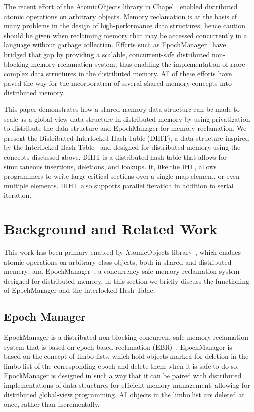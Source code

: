 \documentclass[letterpaper, 10 pt, conference]{ieeeconf}  %
\begin{document}
The recent effort of the AtomicObjects library in Chapel~\cite{epochManager} enabled distributed atomic operations on arbitrary objects.
Memory reclamation is at the basis of many problems in the design of high-performance data structures; hence caution should be given when reclaiming memory that may be accessed concurrently in a language without garbage collection. Efforts such as EpochManager~\cite{epochManager} have bridged that gap by providing a scalable, concurrent-safe distributed non-blocking memory reclamation system, thus enabling the implementation of more complex data structures in the distributed memory.
All of these efforts have paved the way for the incorporation of several shared-memory concepts into distributed memory.

This paper demonstrates how a shared-memory data structure can be made to scale as a global-view data structure in distributed memory by using privatization to distribute the data structure and EpochManager \cite{epochManager} for memory reclamation. We present the Distributed Interlocked Hash Table (DIHT), a data structure inspired by the Interlocked Hash Table~\cite{jenkins2017redesigning} and designed for distributed memory using the concepts discussed above. DIHT is a distributed hash table that allows for simultaneous insertions, deletions, and lookups. It, like the IHT, allows programmers to write large critical sections over a single map element, or even multiple elements. DIHT also supports parallel iteration in addition to serial iteration.

\section{Background and Related Work}
This work has been primary enabled by AtomicObjects library~\cite{epochManager}, which enables atomic operations on arbitrary class objects, both in shared and distributed memory; and EpochManager~\cite{epochManager}, a concurrency-safe memory reclamation system designed for distributed memory. In this section we briefly discuss the functioning of EpochManager and the Interlocked Hash Table.

\subsection{Epoch Manager}
EpochManager is a distributed non-blocking concurrent-safe memory reclamation system that is based on epoch-based reclamation (EBR)~\cite{fraser2004practical}. EpochManager is based on the concept of limbo lists, which hold objects marked for deletion in the limbo-list of the corresponding epoch and delete them when it is safe to do so. EpochManager is designed in such a way that it can be paired with distributed implementations of data structures for efficient memory management, allowing for distributed global-view programming.  All objects in the limbo list are deleted at once, rather than incrementally.
\end{document}
